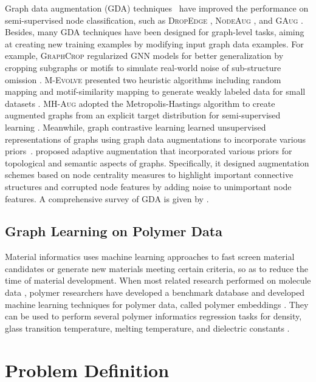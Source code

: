 \documentclass[sigconf]{acmart}
\begin{document}
Graph data augmentation (GDA) techniques~\cite{zhao2022graph,zhao2021counterfactual,zhao2021action,chen2020measuring} have improved the performance on semi-supervised node classification, such as \textsc{DropEdge} \cite{rong2019dropedge}, \textsc{NodeAug} \cite{wang2020nodeaug}, and \textsc{GAug} \cite{zhao2021data}.
Besides, many GDA techniques have been designed for graph-level tasks, aiming at creating new training examples by modifying input graph data examples. For example, \textsc{GraphCrop} regularized GNN models for better generalization by cropping subgraphs or motifs to simulate real-world noise of sub-structure omission \cite{wang2020graphcrop}.
\textsc{M-Evolve} presented two heuristic algorithms including random mapping and motif-similarity mapping to generate weakly labeled data for small datasets \cite{zhou2020data}.
\textsc{MH-Aug} adopted the Metropolis-Hastings algorithm to create augmented graphs from an explicit target distribution for semi-supervised learning \cite{park2021metropolis}.
Meanwhile, graph contrastive learning learned unsupervised representations of graphs using graph data augmentations to incorporate various priors~\cite{you2020graph}. \citet{zhu2021graph} proposed adaptive augmentation that incorporated various priors for topological and semantic aspects of graphs. Specifically, it designed augmentation schemes based on node centrality measures to highlight important connective structures and corrupted node features by adding noise to unimportant node features. A comprehensive survey of GDA is given by \citet{zhao2022graph}.

\subsection{Graph Learning on Polymer Data}

Material informatics uses machine learning approaches to fast screen material candidates or generate new materials meeting certain criteria, so as to reduce the time of material development. When most related research performed on molecule data \cite{guo2021few}, polymer researchers have developed a benchmark database and developed machine learning techniques for polymer data, called polymer embeddings \cite{kim2018polymer,chen2021polymer}. They can be used to perform several polymer informatics regression tasks for density, glass transition temperature, melting temperature, and dielectric constants \cite{ma2019evaluating,ma2020pi1m,wei2021thermal}.
 
\section{Problem Definition}
\label{sec:problem}
\end{document}
